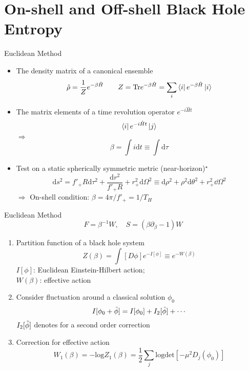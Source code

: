 \documentclass{beamer}
\begin{document}
\section{On-shell and Off-shell Black Hole Entropy}
\begin{frame}{Euclidean Method}
    \begin{itemize}
        \item The density matrix of a canonical ensemble
        \begin{equation*}
            \hat{\rho}=\frac{1}{Z}e^{-\beta\hat{H}} \qquad Z=\mathrm{Tr}e^{-\beta\hat{H}}=\sum_i\bra{i}e^{-\beta\hat{H}}\ket{i}
        \end{equation*}
        \item The matrix elements of a time revolution operator $e^{-i\hat{H}t}$
        \begin{equation*}
            \bra{i}e^{-i\hat{H}t}\ket{j}
        \end{equation*}
        $\Rightarrow$ $$\beta=\int i\mathrm{d}t\equiv \int\mathrm{d}\tau$$ 
        \item Test on a static spherically symmetric metric (near-horizon)$^\star$
        \begin{equation*}
            \mathrm{d}s^2=f'_+R\mathrm{d}\tau^2+\frac{\mathrm{d}r^2}{f'_+R}+r^2_+\mathrm{d}\Omega^2\equiv \mathrm{d}\rho^2+\rho^2\mathrm{d}\theta^2+r_+^2\dd\Omega^2
        \end{equation*}
        $\Rightarrow$ On-shell condition: $\beta=4\pi/f'_+=1/T_H$ 
    \end{itemize}
\end{frame}
\begin{frame}{Euclidean Method}
    \begin{equation*}
        F=\beta^{-1}W,\quad S=(\beta\partial_\beta-1)W
    \end{equation*}
    \begin{enumerate}
        \item Partition function of a black hole system
        \begin{equation*}
            Z(\beta)=\int[D\phi]e^{-I[\phi]}\equiv e^{-W(\beta)}
        \end{equation*}
        $I[\phi]$: Euclidean Einstein-Hilbert action;\\ $W(\beta)$: effective action
        \item Consider fluctuation around a classical solution $\phi_0$
        \begin{equation*}
            I[\phi_0+\Tilde{\phi}]=I[\phi_0]+I_2[\Tilde{\phi}]+\cdots
        \end{equation*}
        $I_2[\Tilde{\phi}]$ denotes for a second order correction
        \item Correction for effective action
        \begin{equation*}
            W_1(\beta)=-\mathrm{log}Z_1(\beta)=\frac{1}{2}\sum_j\mathrm{log}\mathrm{det}[-\mu^2D_j(\phi_0)]
        \end{equation*}
        
    \end{enumerate}
\end{frame}
\end{document}
